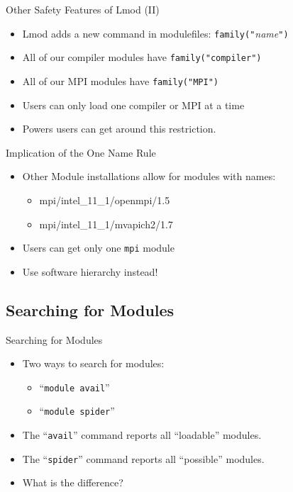 \documentclass{beamer}
\begin{document}
\begin{frame}{Other Safety Features of Lmod (II)}
  \begin{itemize}
    \item Lmod adds a new command in modulefiles: \texttt{family("}\emph{name}\texttt{")}
    \item All of our compiler modules have \texttt{family("compiler")}
    \item All of our MPI modules have \texttt{family("MPI")}
    \item Users can only load one compiler or MPI at a time
    \item Powers users can get around this restriction.
  \end{itemize}
\end{frame}

\begin{frame}{Implication of the One Name Rule}
  \begin{itemize}
    \item Other Module installations allow for modules with names:
      \begin{itemize}
        \item mpi/intel\_11\_1/openmpi/1.5
        \item mpi/intel\_11\_1/mvapich2/1.7
      \end{itemize}
    \item Users can get only one \texttt{mpi} module
    \item Use software hierarchy instead!
  \end{itemize}
\end{frame}




\subsection{Searching for Modules}
\label{sec:search}


\begin{frame}{Searching for Modules}
  \begin{itemize}
    \item Two ways to search for modules:
      \begin{itemize}
        \item ``\texttt{module avail}''
        \item ``\texttt{module spider}''
      \end{itemize}
    \item The ``\texttt{avail}''  command reports all ``loadable'' modules.
    \item The ``\texttt{spider}'' command reports all ``possible'' modules.
    \item What is the difference?
  \end{itemize}
\end{frame}
\end{document}
